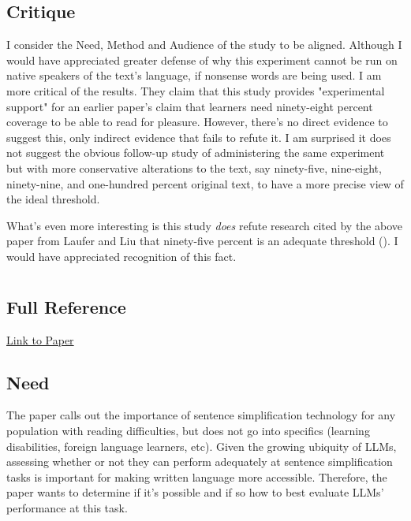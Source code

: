 \documentclass[
	letterpaper, %
]{jdf}
\begin{document}
\subsection{Critique}
I consider the Need, Method and Audience of the study to be aligned. Although I would have appreciated greater defense of why this experiment cannot be run on native speakers of the text's language, if nonsense words are being used. I am more critical of the results. They claim that this study provides "experimental support" for an earlier paper's claim that learners need ninety-eight percent coverage to be able to read for pleasure. However, there's no direct evidence to suggest this, only indirect evidence that fails to refute it. I am surprised it does not suggest the obvious follow-up study of administering the same experiment but with more conservative alterations to the text, say ninety-five, nine-eight, ninety-nine, and one-hundred percent original text, to have a more precise view of the ideal threshold.

What's even more interesting is this study \textit{does} refute research cited by the above paper from Laufer and Liu that ninety-five percent is an adequate threshold (\cite{nation1992vocabulary}). I would have appreciated recognition of this fact.

\section{\cite{wu2024indepth}}
\subsection{Full Reference}

\href{https://arxiv.org/pdf/2403.04963}{Link to Paper}

\subsection{Need}
The paper calls out the importance of sentence simplification technology for any population with reading difficulties, but does not go into specifics (learning disabilities, foreign language learners, etc). Given the growing ubiquity of LLMs, assessing whether or not they can perform adequately at sentence simplification tasks is important for making written language more accessible. Therefore, the paper wants to determine if it's possible and if so how to best evaluate LLMs' performance at this task.
\end{document}
